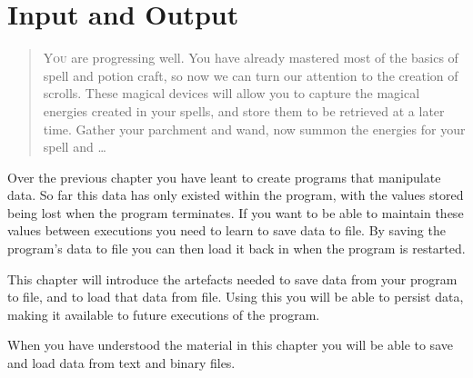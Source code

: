 \chapter{Input and Output} %
\label{cha:input_and_output}

\begin{quote}
  \Fontlukas\Large
  \renewcommand{\LettrineTextFont}{\relax}
  \lettrine[image=true,lines=3,lraise=0.1]
  {Y}{ou} are progressing well. You have already mastered most of the basics of spell and potion craft, so now we can turn our attention to the creation of scrolls. These magical devices will allow you to capture the magical energies created in your spells, and store them to be retrieved at a later time. Gather your parchment and wand, now summon the energies for your spell and \ldots
\end{quote}

\bigskip

Over the previous chapter you have leant to create programs that manipulate data. So far this data has only existed within the program, with the values stored being lost when the program terminates. If you want to be able to maintain these values between executions you need to learn to save data to file. By saving the program's data to file you can then load it back in when the program is restarted.

This chapter will introduce the artefacts needed to save data from your program to file, and to load that data from file. Using this you will be able to persist data, making it available to future executions of the program.

When you have understood the material in this chapter you will be able to save and load data from text and binary files. 

\clearpage

\minitoc









% 

\clearpage
\def\pageLang{none}
% 
% 
% 
% 



